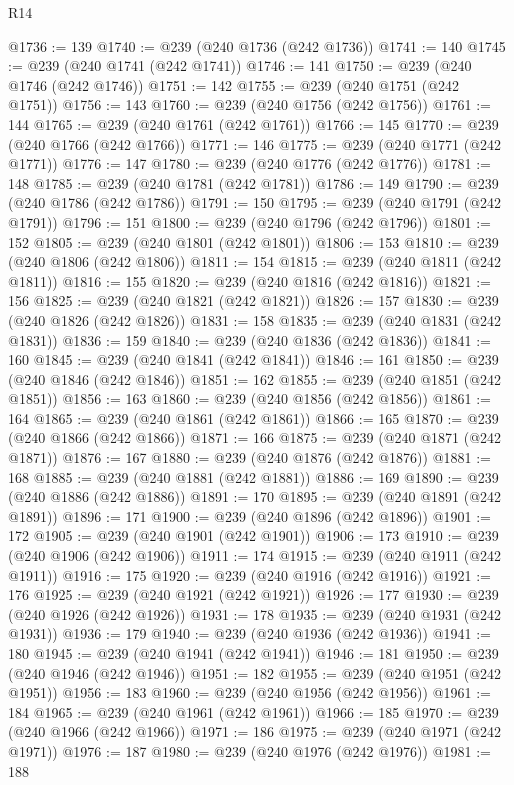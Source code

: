 \begin{lexlean}{R14}
\begin{coremodule}
@1736 := 139
@1740 := @239 (@240 @1736 (@242 @1736))
@1741 := 140
@1745 := @239 (@240 @1741 (@242 @1741))
@1746 := 141
@1750 := @239 (@240 @1746 (@242 @1746))
@1751 := 142
@1755 := @239 (@240 @1751 (@242 @1751))
@1756 := 143
@1760 := @239 (@240 @1756 (@242 @1756))
@1761 := 144
@1765 := @239 (@240 @1761 (@242 @1761))
@1766 := 145
@1770 := @239 (@240 @1766 (@242 @1766))
@1771 := 146
@1775 := @239 (@240 @1771 (@242 @1771))
@1776 := 147
@1780 := @239 (@240 @1776 (@242 @1776))
@1781 := 148
@1785 := @239 (@240 @1781 (@242 @1781))
@1786 := 149
@1790 := @239 (@240 @1786 (@242 @1786))
@1791 := 150
@1795 := @239 (@240 @1791 (@242 @1791))
@1796 := 151
@1800 := @239 (@240 @1796 (@242 @1796))
@1801 := 152
@1805 := @239 (@240 @1801 (@242 @1801))
@1806 := 153
@1810 := @239 (@240 @1806 (@242 @1806))
@1811 := 154
@1815 := @239 (@240 @1811 (@242 @1811))
@1816 := 155
@1820 := @239 (@240 @1816 (@242 @1816))
@1821 := 156
@1825 := @239 (@240 @1821 (@242 @1821))
@1826 := 157
@1830 := @239 (@240 @1826 (@242 @1826))
@1831 := 158
@1835 := @239 (@240 @1831 (@242 @1831))
@1836 := 159
@1840 := @239 (@240 @1836 (@242 @1836))
@1841 := 160
@1845 := @239 (@240 @1841 (@242 @1841))
@1846 := 161
@1850 := @239 (@240 @1846 (@242 @1846))
@1851 := 162
@1855 := @239 (@240 @1851 (@242 @1851))
@1856 := 163
@1860 := @239 (@240 @1856 (@242 @1856))
@1861 := 164
@1865 := @239 (@240 @1861 (@242 @1861))
@1866 := 165
@1870 := @239 (@240 @1866 (@242 @1866))
@1871 := 166
@1875 := @239 (@240 @1871 (@242 @1871))
@1876 := 167
@1880 := @239 (@240 @1876 (@242 @1876))
@1881 := 168
@1885 := @239 (@240 @1881 (@242 @1881))
@1886 := 169
@1890 := @239 (@240 @1886 (@242 @1886))
@1891 := 170
@1895 := @239 (@240 @1891 (@242 @1891))
@1896 := 171
@1900 := @239 (@240 @1896 (@242 @1896))
@1901 := 172
@1905 := @239 (@240 @1901 (@242 @1901))
@1906 := 173
@1910 := @239 (@240 @1906 (@242 @1906))
@1911 := 174
@1915 := @239 (@240 @1911 (@242 @1911))
@1916 := 175
@1920 := @239 (@240 @1916 (@242 @1916))
@1921 := 176
@1925 := @239 (@240 @1921 (@242 @1921))
@1926 := 177
@1930 := @239 (@240 @1926 (@242 @1926))
@1931 := 178
@1935 := @239 (@240 @1931 (@242 @1931))
@1936 := 179
@1940 := @239 (@240 @1936 (@242 @1936))
@1941 := 180
@1945 := @239 (@240 @1941 (@242 @1941))
@1946 := 181
@1950 := @239 (@240 @1946 (@242 @1946))
@1951 := 182
@1955 := @239 (@240 @1951 (@242 @1951))
@1956 := 183
@1960 := @239 (@240 @1956 (@242 @1956))
@1961 := 184
@1965 := @239 (@240 @1961 (@242 @1961))
@1966 := 185
@1970 := @239 (@240 @1966 (@242 @1966))
@1971 := 186
@1975 := @239 (@240 @1971 (@242 @1971))
@1976 := 187
@1980 := @239 (@240 @1976 (@242 @1976))
@1981 := 188

\end{coremodule}
\end{lexlean}
